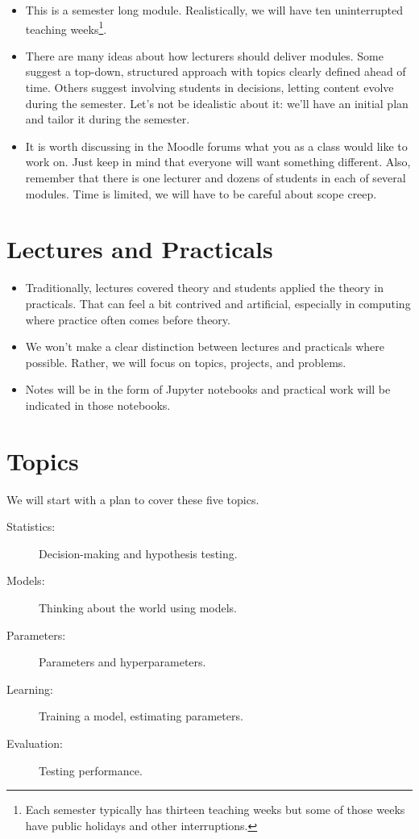 \documentclass[a4paper]{tufte-handout}
\begin{document}
\begin{itemize}
  \item This is a semester long module. Realistically, we will have ten uninterrupted teaching weeks\footnote{Each semester typically has thirteen teaching weeks but some of those weeks have public holidays and other interruptions.}.
  \item There are many ideas about how lecturers should deliver modules. Some suggest a top-down, structured approach with topics clearly defined ahead of time. Others suggest involving students in decisions, letting content evolve during the semester. Let's not be idealistic about it: we'll have an initial plan and tailor it during the semester.
  \item It is worth discussing in the Moodle forums what you as a class would like to work on. Just keep in mind that everyone will want something different. Also, remember that there is one lecturer and dozens of students in each of several modules. Time is limited, we will have to be careful about scope creep.
\end{itemize}

 
\section{Lectures and Practicals}

\begin{itemize}
  \item Traditionally, lectures covered theory and students applied the theory in practicals. That can feel a bit contrived and artificial, especially in computing where practice often comes before theory.
  \item We won't make a clear distinction between lectures and practicals where possible. Rather, we will focus on topics, projects, and problems.
  \item Notes will be in the form of Jupyter notebooks and practical work will be indicated in those notebooks.
\end{itemize}


\section{Topics}

We will start with a plan to cover these five topics.

\begin{description}
  \item[Statistics:] Decision-making and hypothesis testing.
  \item[Models:] Thinking about the world using models.
  \item[Parameters:] Parameters and hyperparameters.
  \item[Learning:] Training a model, estimating parameters.
  \item[Evaluation:] Testing performance.
\end{description}
\end{document}
